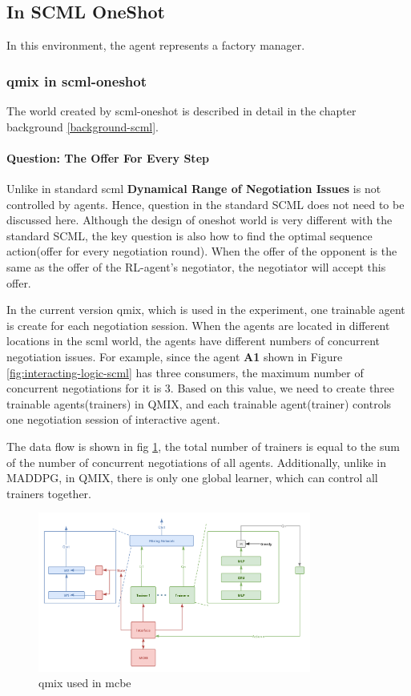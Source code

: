 \subsection{In SCML OneShot}
In this environment, the agent represents a factory manager.

\subsubsection{\gls{qmix} in \gls{scml-oneshot}} \label{methods:qmix-scml-oneshot}

The world created by \gls{scml-oneshot} is described in detail in the chapter background \ref{background-scml}. 

\paragraph{Question: The Offer For Every Step} Unlike in standard scml \textbf{Dynamical Range of Negotiation Issues} is not controlled by agents. Hence, question in the standard SCML does not need to be discussed here. Although the design of oneshot world is very different with the standard SCML, the key question is also how to find the optimal sequence action(offer for every negotiation round). When the offer of the opponent is the same as the offer of the RL-agent's negotiator, the negotiator will accept this offer.

In the current version \gls{qmix}, which is used in the experiment, one trainable agent is create for each negotiation session. When the agents are located in different locations in the scml world, the agents have different numbers of concurrent negotiation issues. For example, since the agent \textbf{A1} shown in Figure \ref{fig:interacting-logic-scml} has three consumers, the maximum number of concurrent negotiations for it is 3. Based on this value, we need to create three trainable agents(trainers) in QMIX, and each trainable agent(trainer) controls one negotiation session of interactive agent.

The data flow is shown in fig \ref{fig:method-qmix-scml}, the total number of trainers is equal to the sum of the number of concurrent negotiations of all agents. Additionally, unlike in MADDPG, in QMIX, there is only one global learner, which can control all trainers together.

\begin{figure}[htbp]
\centering
\includegraphics[width=0.80\textwidth]{./images/scml-qmix.png}
\caption{\gls{qmix} used in \gls{mcbe}}
\label{fig:method-qmix-scml}
\end{figure}


